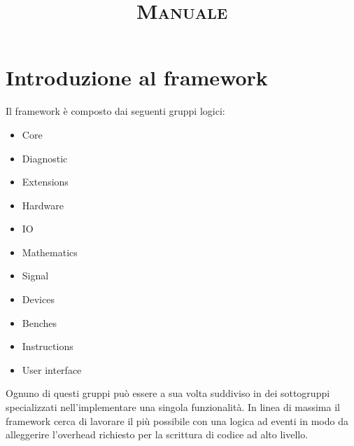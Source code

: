 \documentclass{article}
\begin{document}
	\title{
		\begin{titlepage}
			\centering
			
			{\huge\bfseries \textsc{Manuale} \par}
			\vspace{2cm}					
		\end{titlepage}
	}

	\maketitle
	
	
	\tableofcontents
	\newpage
	
	\listoffigures
	\newpage
	
	\listoftables
	\newpage
	
	
	\maketitle
	\newpage
	
	\section{Introduzione al framework}
		Il framework è composto dai seguenti gruppi logici:
		
		\begin{itemize}
			\item Core
			\item Diagnostic
			\item Extensions
			\item Hardware
			\item IO
			\item Mathematics
			\item Signal
			\item Devices
			\item Benches
			\item Instructions
			\item User interface
		\end{itemize}
		
		Ognuno di questi gruppi può essere a sua volta suddiviso in dei sottogruppi specializzati nell'implementare una singola funzionalità. In linea di massima il framework cerca di lavorare il più possibile con una logica ad eventi in modo da alleggerire l'overhead richiesto per la scrittura di codice ad alto livello.
	\newpage
	
\end{document}

